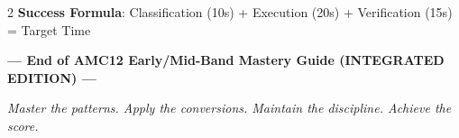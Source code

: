 \documentclass{article}
\begin{document}
\begin{tcolorbox}[colback=blue!5!white,colframe=blue!75!black,title={\textbf{Competition Day Quick Reference}}]
\begin{multicols}{2}
\textbf{Success Formula}: Classification (10s) + Execution (20s) + Verification (15s) = Target Time
\end{multicols}
\end{tcolorbox}

\vfill

\begin{center}
\textbf{--- End of AMC12 Early/Mid-Band Mastery Guide (INTEGRATED EDITION) ---}

\textit{Master the patterns. Apply the conversions. Maintain the discipline. Achieve the score.}
\end{center}
\end{document}
